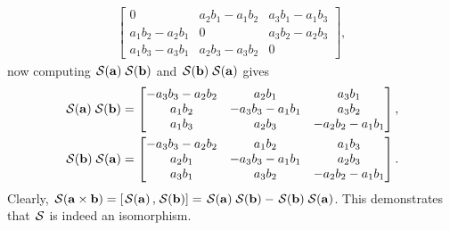 \begin{example}
\begin{align*}
\begin{bmatrix}
            0 & a_2b_1-a_1b_2 & a_3b_1-a_1b_3\\
            a_1b_2 - a_2b_1 & 0 & a_3b_2-a_2b_3\\
            a_1b_3-a_3b_1 & a_2b_3-a_3b_2 & 0
        \end{bmatrix},
    \end{align*}
    now computing $\SL[\mathbf{a}]\SL[\mathbf{b}]$ and $\SL[\mathbf{b}]\SL[\mathbf{a}]$ gives
    \begin{align*}
        \SL[\mathbf{a}]\SL[\mathbf{b}] &=
        \begin{bmatrix}
            -a_3b_3 -a_2b_2 & a_2b_1 & a_3b_1\\
            a_1b_2 & -a_3b_3 - a_1b_1 & a_3b_2\\
            a_1b_3 & a_2b_3 & -a_2b_2 - a_1b_1
        \end{bmatrix},\\
        \SL[\mathbf{b}]\SL[\mathbf{a}] &=
        \begin{bmatrix}
            -a_3b_3 -a_2b_2 & a_1b_2 & a_1b_3\\
            a_2b_1 & -a_3b_3 - a_1b_1 & a_2b_3\\
            a_3b_1 & a_3b_2 & -a_2b_2 - a_1b_1
        \end{bmatrix}.
    \end{align*}
    Clearly, $\SL[\mathbf{a}\times \mathbf{b}] = [\SL[\mathbf{a}], \SL[\mathbf{b}]] = \SL[\mathbf{a}]\SL[\mathbf{b}] - \SL[\mathbf{b}]\SL[\mathbf{a}]$. This demonstrates that $\SL$ is indeed an isomorphism.
\end{example}

